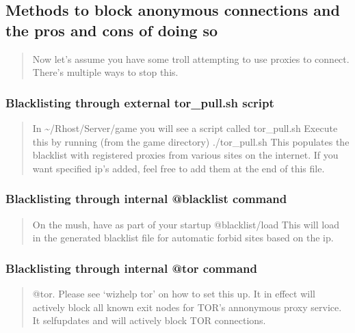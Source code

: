 \documentclass[letterpaper,10pt,english]{sphinxmanual}
\begin{document}
\subsection{Methods to block anonymous connections and the pros and cons of doing so}
\label{\detokenize{security:methods-to-block-anonymous-connections-and-the-pros-and-cons-of-doing-so}}\begin{quote}

\sphinxAtStartPar
Now let’s assume you have some troll attempting to use proxies to connect.
There’s multiple ways to stop this.
\end{quote}


\subsubsection{Blacklisting through external tor\_pull.sh script}
\label{\detokenize{security:blacklisting-through-external-tor-pull-sh-script}}\begin{quote}

\sphinxAtStartPar
In \textasciitilde{}/Rhost/Server/game you will see a script called tor\_pull.sh
Execute this by running (from the game directory) ./tor\_pull.sh
This populates the blacklist with registered proxies from various sites
on the internet.  If you want specified ip’s added, feel free to add
them at the end of this file.
\end{quote}


\subsubsection{Blacklisting through internal @blacklist command}
\label{\detokenize{security:blacklisting-through-internal-blacklist-command}}\begin{quote}

\sphinxAtStartPar
On the mush, have as part of your startup @blacklist/load
This will load in the generated blacklist file for automatic forbid
sites based on the ip.
\end{quote}


\subsubsection{Blacklisting through internal @tor command}
\label{\detokenize{security:blacklisting-through-internal-tor-command}}\begin{quote}

\sphinxAtStartPar
@tor.  Please see ‘wizhelp tor’ on how to set this up.  It in effect
will actively block all known exit nodes for TOR’s annonymous proxy
service.  It self\sphinxhyphen{}updates and will actively block TOR connections.
\end{quote}
\end{document}
